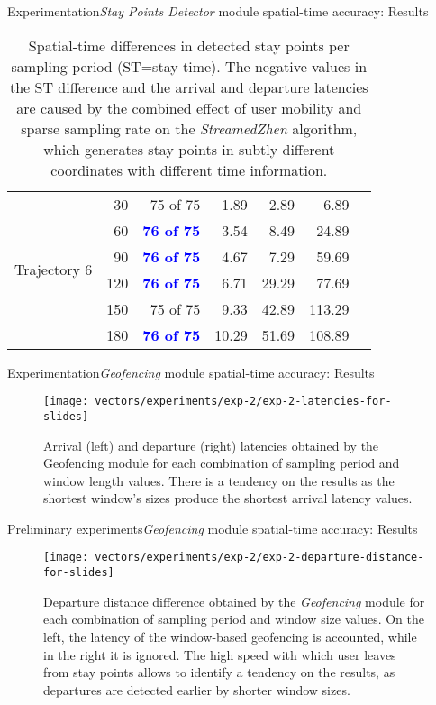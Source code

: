 \begin{frame}[noframenumbering]{Experimentation}{\emph{Stay Points Detector} module spatial-time accuracy: Results}
\begin{table}
{\begin{tabular}{@{}lrrrrrr@{}}
\multirow{6}{*}{Trajectory 6} 
 & 30 & 75 of 75 & 1.89 & 2.89 & 6.89 \\
 & 60 & \textcolor{blue}{\textbf{76 of 75}} & 3.54 & 8.49 & 24.89 \\
 & 90 & \textcolor{blue}{\textbf{76 of 75}} & 4.67  & 7.29 & 59.69 \\
 & 120 & \textcolor{blue}{\textbf{76 of 75}} & 6.71 & 29.29 & 77.69 \\
 & 150 & 75 of 75 & 9.33 & 42.89 & 113.29 \\
 & 180 & \textcolor{blue}{\textbf{76 of 75}} & 10.29 & 51.69 & 108.89 \\
 \bottomrule 
\end{tabular}
}
\caption{Spatial-time differences in detected stay points per sampling period (ST=stay time). The negative values in the ST difference and the arrival and departure latencies are caused by the combined effect of user mobility and sparse sampling rate on the \emph{StreamedZhen} algorithm, which generates stay points in subtly different coordinates with different time information.}
\end{table}
\end{frame}



\begin{frame}[noframenumbering]{Experimentation}{\emph{Geofencing} module spatial-time accuracy: Results}
\vspace{-0.5cm}
\begin{figure}
  \centering
  \texttt{[image: vectors/experiments/exp-2/exp-2-latencies-for-slides]}
  \caption{Arrival (left) and departure (right) latencies obtained by the Geofencing  module for each combination of sampling period and window length values. There is a tendency on the results as the shortest window’s sizes produce the shortest arrival latency values.}
\end{figure}
\end{frame}

\begin{frame}[noframenumbering]{Preliminary experiments}{\emph{Geofencing} module spatial-time accuracy: Results}
\vspace{-0.5cm}
\begin{figure}
  \centering
  \texttt{[image: vectors/experiments/exp-2/exp-2-departure-distance-for-slides]}
  \caption{Departure distance difference obtained by the \emph{Geofencing} module for each combination of sampling period and window size values. On the left, the latency of the window-based geofencing is accounted, while in the right it is ignored. The high speed with which user leaves from stay points allows to identify a tendency on the results, as departures are detected earlier by shorter window sizes.}
\end{figure}
\end{frame}


